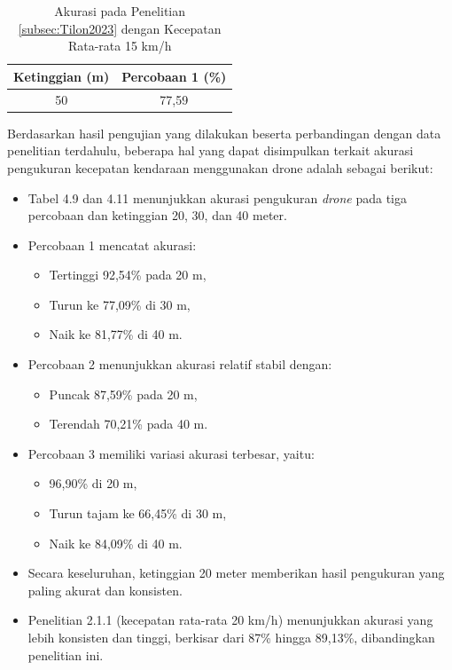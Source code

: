 \begin{table}[H]
\centering
\caption{Akurasi pada Penelitian \ref{subsec:Tilon2023} dengan Kecepatan Rata-rata 15 km/h}
\label{table:accuracy_tilon}
\begin{tabular}{|c|c|}
\hline
\textbf{Ketinggian (m)} & \textbf{Percobaan 1 (\%)} \\ \hline
50 & 77,59 \\ \hline
\end{tabular}
\end{table}

Berdasarkan hasil pengujian yang dilakukan beserta perbandingan dengan data penelitian terdahulu, beberapa hal yang dapat disimpulkan terkait akurasi pengukuran kecepatan kendaraan menggunakan drone adalah sebagai berikut:

\begin{itemize}[nolistsep]
    \item Tabel 4.9 dan 4.11 menunjukkan akurasi pengukuran \emph{drone} pada tiga percobaan dan ketinggian 20, 30, dan 40 meter.
    \item Percobaan 1 mencatat akurasi:
    \begin{itemize}[nolistsep]
        \item Tertinggi 92,54\% pada 20 m,
        \item Turun ke 77,09\% di 30 m,
        \item Naik ke 81,77\% di 40 m.
    \end{itemize}
    \item Percobaan 2 menunjukkan akurasi relatif stabil dengan:
    \begin{itemize}[nolistsep]
        \item Puncak 87,59\% pada 20 m,
        \item Terendah 70,21\% pada 40 m.
    \end{itemize}
    \item Percobaan 3 memiliki variasi akurasi terbesar, yaitu:
    \begin{itemize}[nolistsep]
        \item 96,90\% di 20 m,
        \item Turun tajam ke 66,45\% di 30 m,
        \item Naik ke 84,09\% di 40 m.
    \end{itemize}
    \item Secara keseluruhan, ketinggian 20 meter memberikan hasil pengukuran yang paling akurat dan konsisten.
    \item Penelitian 2.1.1 (kecepatan rata-rata 20 km/h) menunjukkan akurasi yang lebih konsisten dan tinggi, berkisar dari 87\% hingga 89,13\%, dibandingkan penelitian ini.

\end{itemize}
